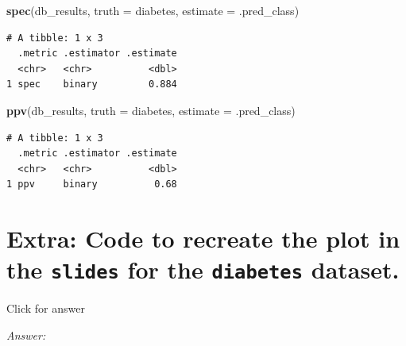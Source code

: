 \documentclass[
]{book}
\newenvironment{Shaded}{\begin{snugshade}}{\end{snugshade}}
\newcommand{\AttributeTok}[1]{\textcolor[rgb]{0.13,0.29,0.53}{#1}}
\newcommand{\FunctionTok}[1]{\textcolor[rgb]{0.13,0.29,0.53}{\textbf{#1}}}
\newcommand{\NormalTok}[1]{#1}
\begin{document}
\begin{Shaded}
\begin{Highlighting}[]
\FunctionTok{spec}\NormalTok{(db\_results, }\AttributeTok{truth =}\NormalTok{ diabetes,}
         \AttributeTok{estimate =}\NormalTok{ .pred\_class)}
\end{Highlighting}
\end{Shaded}

\begin{verbatim}
# A tibble: 1 x 3
  .metric .estimator .estimate
  <chr>   <chr>          <dbl>
1 spec    binary         0.884
\end{verbatim}

\begin{Shaded}
\begin{Highlighting}[]
\FunctionTok{ppv}\NormalTok{(db\_results, }\AttributeTok{truth =}\NormalTok{ diabetes,}
         \AttributeTok{estimate =}\NormalTok{ .pred\_class)}
\end{Highlighting}
\end{Shaded}

\begin{verbatim}
# A tibble: 1 x 3
  .metric .estimator .estimate
  <chr>   <chr>          <dbl>
1 ppv     binary          0.68
\end{verbatim}

\hypertarget{extra-code-to-recreate-the-plot-in-the-slides-for-the-diabetes-dataset.}{%
\section{\texorpdfstring{Extra: Code to recreate the plot in the \texttt{slides} for the \texttt{diabetes} dataset.}{Extra: Code to recreate the plot in the slides for the diabetes dataset.}}\label{extra-code-to-recreate-the-plot-in-the-slides-for-the-diabetes-dataset.}}

Click for answer

\emph{Answer:}
\end{document}
